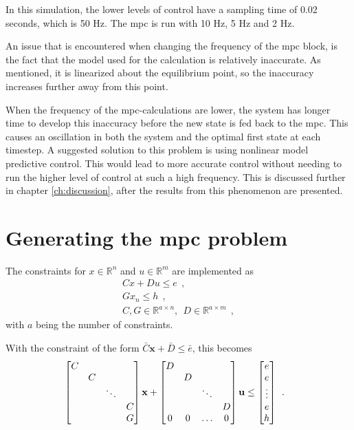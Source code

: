 In this simulation, the lower levels of control have a sampling time of 0.02 seconds, which is 50 Hz. The \acrshort{mpc} is run with 10 Hz, 5 Hz and 2 Hz.

An issue that is encountered when changing the frequency of the \acrshort{mpc} block, is the fact that the model used for the calculation is relatively inaccurate. As mentioned, it is linearized about the equilibrium point, so the inaccuracy increases further away from this point. 

When the frequency of the \acrshort{mpc}-calculations are lower, the system has longer time to develop this inaccuracy before the new state is fed back to the \acrshort{mpc}. This causes an oscillation in both the system and the optimal first state at each timestep. A suggested solution to this problem is using nonlinear model predictive control. This would lead to more accurate control without needing to run the higher level of control at such a high frequency. This is discussed further in chapter \ref{ch:discussion}, after the results from this phenomenon are presented.  



\section{Generating the \acrshort{mpc} problem}

The constraints for $x \in \mathbb{R}^n$ and $u \in \mathbb{R}^m$ are implemented as 
\begin{equation}
    \begin{split}
        Cx + Du \leq e \: \: , \\
        G x_n \leq h \: \: , \\
        C, G \in \mathbb{R}^{a\times n}, \: \: D \in \mathbb{R}^{a \times m} \: \: ,
    \end{split}
\end{equation}
with $a$ being the number of constraints.

With the constraint of the form $\bar C \bm x + \bar D \bm \leq \bar e$, this becomes
\begin{equation}
    \begin{split}
        &\begin{bmatrix}C & & & \\
            & C & &   \\
             & & \ddots  & \\
             &  & & C \\
             & & & G\end{bmatrix} \mathbf{x} + \begin{bmatrix}D & & & \\
            & D & &  \\
             & & \ddots &  \\
             &  & & D \\
             0 & 0 & \hdots & 0\end{bmatrix} \mathbf{u} \leq \begin{bmatrix}e \\ e \\ \vdots\\ e \\ h\end{bmatrix}\: \: .
    \end{split}
\end{equation}

